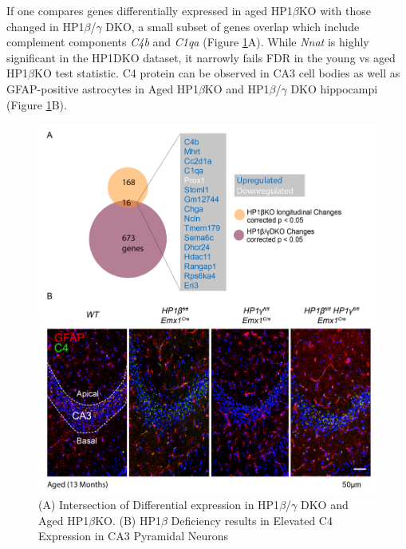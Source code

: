 \documentclass[onehalf,12pt]{beavtex}
\begin{document}
  If one compares genes differentially expressed in aged HP1\(\beta\)KO
  with those changed in HP1\(\beta\)/\(\gamma\) DKO, a small subset of
  genes overlap which include complement components \emph{C4b} and
  \emph{C1qa} (Figure \ref{fig:C4}A). While \emph{Nnat} is highly
  significant in the HP1DKO dataset, it narrowly fails FDR in the young vs
  aged HP1\(\beta\)KO test statistic. C4 protein can be observed in CA3
  cell bodies as well as GFAP-positive astrocytes in Aged HP1\(\beta\)KO
  and HP1\(\beta\)/\(\gamma\) DKO hippocampi (Figure \ref{fig:C4}B).
  
  \begin{figure}
  
  {\centering \includegraphics[width=1\linewidth, ]{./figure/results/C4_GFAP} 
  
  }
  
  \caption[HP1$\beta$ Deficiency Results in Elevated C4 Expression in CA3 Pyramidal Neurons]{(A) Intersection of Differential expression in HP1$\beta$/$\gamma$ DKO and Aged HP1$\beta$KO. (B) HP1$\beta$ Deficiency results in Elevated C4 Expression in CA3 Pyramidal Neurons}\label{fig:C4}
  \end{figure}
  
\end{document}
